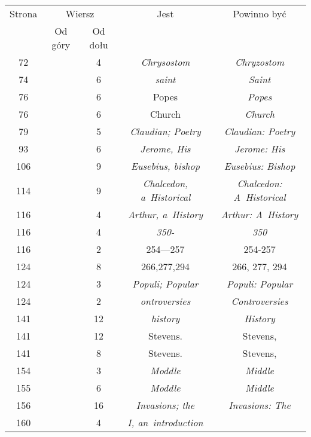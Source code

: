 \documentclass[a4paper,11pt]{article}
\begin{document}
\begin{center}
  \begin{tabular}{|c|c|c|c|c|}
    \hline
    Strona & \multicolumn{2}{c|}{Wiersz} & Jest
                              & Powinno być \\ \cline{2-3}
    & Od góry & Od dołu & & \\
    \hline
    \hphantom{0}72 & & \hphantom{0}4 & \textit{Chrysostom}
    & \textit{Chryzostom} \\
    \hphantom{0}74 & & \hphantom{0}6 & \textit{saint} & \textit{Saint} \\
    \hphantom{0}76 & & \hphantom{0}6 & Popes & \textit{Popes} \\
    \hphantom{0}76 & & \hphantom{0}6 & Church & \textit{Church} \\
    \hphantom{0}79 & & \hphantom{0}5 & \textit{Claudian; Poetry}
    & \textit{Claudian: Poetry} \\
    \hphantom{0}93 & & \hphantom{0}6 & \textit{Jerome, His}
    & \textit{Jerome: His} \\
    106 & & \hphantom{0}9 & \textit{Eusebius, bishop}
    & \textit{Eusebius: Bishop} \\
    114 & & \hphantom{0}9 & \textit{Chalcedon, a~Historical}
           & \textit{Chalcedon: A~Historical} \\
    116 & & \hphantom{0}4 & \textit{Arthur, a~History}
    & \textit{Arthur: A~History} \\
    116 & & \hphantom{0}4 & \textit{350-} & \textit{350} \\
    116 & & \hphantom{0}2 & 254---257 & 254-257 \\
    124 & & \hphantom{0}8 & 266,277,294 & 266, 277, 294 \\
    124 & & \hphantom{0}3 & \textit{Populi; Popular}
    & \textit{Populi: Popular} \\
    124 & & \hphantom{0}2 & \textit{ontroversies}
    & \textit{Controversies} \\
    141 & & 12 & \textit{history} & \textit{History} \\
    141 & & 12 & Stevens. & Stevens, \\
    141 & & \hphantom{0}8 & Stevens. & Stevens, \\
    154 & & \hphantom{0}3 & \textit{Moddle} & \textit{Middle} \\
    155 & & \hphantom{0}6 & \textit{Moddle} & \textit{Middle} \\
    156 & & 16 & \textit{Invasions; the} & \textit{Invasions: The} \\
    160 & & \hphantom{0}4 & \textit{I, an~introduction}

\end{tabular}
\end{center}
\end{document}
